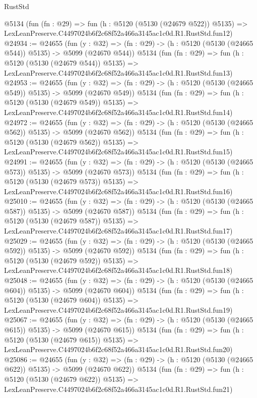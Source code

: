 \begin{lexlean}{RustStd}
\begin{coremodule}
    @5134
    (fun (fn : @29) =>
    fun (h : @5120 (@5130 (@24679 @522)) @5135) =>
    LexLeanPreserve.C4497024b6f2c68f52a466a3145ac1c0d.R1.RustStd.fun12)
@24934 := @24655
    (fun (y : @32) => (fn : @29) -> (h : @5120 (@5130 (@24665 @544)) @5135) -> @5099 (@24670 @544))
    @5134
    (fun (fn : @29) =>
    fun (h : @5120 (@5130 (@24679 @544)) @5135) =>
    LexLeanPreserve.C4497024b6f2c68f52a466a3145ac1c0d.R1.RustStd.fun13)
@24953 := @24655
    (fun (y : @32) => (fn : @29) -> (h : @5120 (@5130 (@24665 @549)) @5135) -> @5099 (@24670 @549))
    @5134
    (fun (fn : @29) =>
    fun (h : @5120 (@5130 (@24679 @549)) @5135) =>
    LexLeanPreserve.C4497024b6f2c68f52a466a3145ac1c0d.R1.RustStd.fun14)
@24972 := @24655
    (fun (y : @32) => (fn : @29) -> (h : @5120 (@5130 (@24665 @562)) @5135) -> @5099 (@24670 @562))
    @5134
    (fun (fn : @29) =>
    fun (h : @5120 (@5130 (@24679 @562)) @5135) =>
    LexLeanPreserve.C4497024b6f2c68f52a466a3145ac1c0d.R1.RustStd.fun15)
@24991 := @24655
    (fun (y : @32) => (fn : @29) -> (h : @5120 (@5130 (@24665 @573)) @5135) -> @5099 (@24670 @573))
    @5134
    (fun (fn : @29) =>
    fun (h : @5120 (@5130 (@24679 @573)) @5135) =>
    LexLeanPreserve.C4497024b6f2c68f52a466a3145ac1c0d.R1.RustStd.fun16)
@25010 := @24655
    (fun (y : @32) => (fn : @29) -> (h : @5120 (@5130 (@24665 @587)) @5135) -> @5099 (@24670 @587))
    @5134
    (fun (fn : @29) =>
    fun (h : @5120 (@5130 (@24679 @587)) @5135) =>
    LexLeanPreserve.C4497024b6f2c68f52a466a3145ac1c0d.R1.RustStd.fun17)
@25029 := @24655
    (fun (y : @32) => (fn : @29) -> (h : @5120 (@5130 (@24665 @592)) @5135) -> @5099 (@24670 @592))
    @5134
    (fun (fn : @29) =>
    fun (h : @5120 (@5130 (@24679 @592)) @5135) =>
    LexLeanPreserve.C4497024b6f2c68f52a466a3145ac1c0d.R1.RustStd.fun18)
@25048 := @24655
    (fun (y : @32) => (fn : @29) -> (h : @5120 (@5130 (@24665 @604)) @5135) -> @5099 (@24670 @604))
    @5134
    (fun (fn : @29) =>
    fun (h : @5120 (@5130 (@24679 @604)) @5135) =>
    LexLeanPreserve.C4497024b6f2c68f52a466a3145ac1c0d.R1.RustStd.fun19)
@25067 := @24655
    (fun (y : @32) => (fn : @29) -> (h : @5120 (@5130 (@24665 @615)) @5135) -> @5099 (@24670 @615))
    @5134
    (fun (fn : @29) =>
    fun (h : @5120 (@5130 (@24679 @615)) @5135) =>
    LexLeanPreserve.C4497024b6f2c68f52a466a3145ac1c0d.R1.RustStd.fun20)
@25086 := @24655
    (fun (y : @32) => (fn : @29) -> (h : @5120 (@5130 (@24665 @622)) @5135) -> @5099 (@24670 @622))
    @5134
    (fun (fn : @29) =>
    fun (h : @5120 (@5130 (@24679 @622)) @5135) =>
    LexLeanPreserve.C4497024b6f2c68f52a466a3145ac1c0d.R1.RustStd.fun21)

\end{coremodule}
\end{lexlean}
